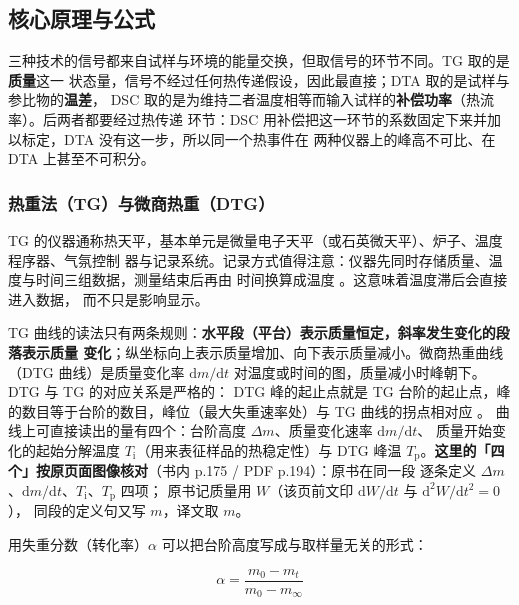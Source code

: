 \subsection{核心原理与公式}

\begin{principle}
三种技术的信号都来自试样与环境的能量交换，但取信号的环节不同。TG 取的是\textbf{质量}这一
状态量，信号不经过任何热传递假设，因此最直接；DTA 取的是试样与参比物的\textbf{温差}，
DSC 取的是为维持二者温度相等而输入试样的\textbf{补偿功率}（热流率）。后两者都要经过热传递
环节：DSC 用补偿把这一环节的系数固定下来并加以标定，DTA 没有这一步，所以同一个热事件在
两种仪器上的峰高不可比、在 DTA 上甚至不可积分。
\end{principle}

\subsubsection{热重法（TG）与微商热重（DTG）}

TG 的仪器通称热天平，基本单元是微量电子天平（或石英微天平）、炉子、温度程序器、气氛控制
器与记录系统。记录方式值得注意：仪器先同时存储质量、温度与时间三组数据，测量结束后再由
时间换算成温度 。这意味着温度滞后会直接进入数据，
而不只是影响显示。

TG 曲线的读法只有两条规则：\textbf{水平段（平台）表示质量恒定，斜率发生变化的段落表示质量
变化}；纵坐标向上表示质量增加、向下表示质量减小。微商热重曲线（DTG 曲线）是质量变化率
$\mathrm{d}m/\mathrm{d}t$ 对温度或时间的图，质量减小时峰朝下。DTG 与 TG 的对应关系是严格的：
DTG 峰的起止点就是 TG 台阶的起止点，峰的数目等于台阶的数目，峰位（最大失重速率处）与 TG
曲线的拐点相对应 。
曲线上可直接读出的量有四个：台阶高度 $\Delta m$、质量变化速率 $\mathrm{d}m/\mathrm{d}t$、
质量开始变化的起始分解温度 $T_{\mathrm{i}}$（用来表征样品的热稳定性）与 DTG 峰温
$T_{\mathrm{p}}$。\textbf{这里的「四个」按原页面图像核对}（书内 p.175 / PDF p.194）：原书在同一段
逐条定义 $\Delta m$、$\mathrm{d}m/\mathrm{d}t$、$T_{\mathrm{i}}$、$T_{\mathrm{p}}$ 四项；
原书记质量用 $W$（该页前文印 $\mathrm{d}W/\mathrm{d}t$ 与 $\mathrm{d}^{2}W/\mathrm{d}t^{2}=0$），
同段的定义句又写 $m$，译文取 $m$。

用失重分数（转化率）$\alpha$ 可以把台阶高度写成与取样量无关的形式：

\begin{equation}\label{eq:ch03-alpha}
\alpha=\frac{m_0-m_t}{m_0-m_\infty}
\end{equation}

